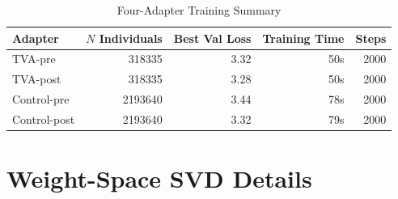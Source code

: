 \documentclass[12pt]{article}
\begin{document}
\begin{table}[H]
\centering
\caption{Four-Adapter Training Summary}
\label{tab:adapter_training}
\begin{tabular}{lrrrr}
\toprule
Adapter & $N$ Individuals & Best Val Loss & Training Time & Steps \\
\midrule
TVA-pre & \num{318335} & 3.32 & 50s & \num{2000} \\
TVA-post & \num{318335} & 3.28 & 50s & \num{2000} \\
Control-pre & \num{2193640} & 3.44 & 78s & \num{2000} \\
Control-post & \num{2193640} & 3.32 & 79s & \num{2000} \\
\bottomrule
\end{tabular}
\end{table}


\section{Weight-Space SVD Details}
\label{app:svd}
\end{document}
